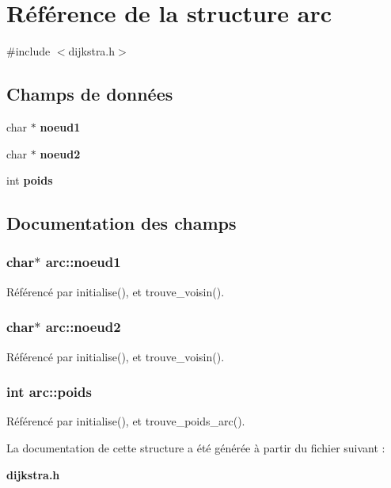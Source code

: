 \section{Référence de la structure arc}
\label{structarc}


{\ttfamily \#include $<$dijkstra.\+h$>$}

\subsection*{Champs de données}
\begin{DoxyCompactItemize}
\item 
char $\ast$ {\bf noeud1}
\item 
char $\ast$ {\bf noeud2}
\item 
int {\bf poids}
\end{DoxyCompactItemize}


\subsection{Documentation des champs}
\subsubsection[{noeud1}]{\setlength{\rightskip}{0pt plus 5cm}char$\ast$ arc\+::noeud1}\label{structarc_aa2263e0b245a2aa17c2bdcf0f98c6c05}


Référencé par initialise(), et trouve\+\_\+voisin().

\subsubsection[{noeud2}]{\setlength{\rightskip}{0pt plus 5cm}char$\ast$ arc\+::noeud2}\label{structarc_a5306f4a0edda9a31693f9a891ef4051b}


Référencé par initialise(), et trouve\+\_\+voisin().

\subsubsection[{poids}]{\setlength{\rightskip}{0pt plus 5cm}int arc\+::poids}\label{structarc_a3859eb36dff284afbc474e0eb89a2b7c}


Référencé par initialise(), et trouve\+\_\+poids\+\_\+arc().



La documentation de cette structure a été générée à partir du fichier suivant \+:\begin{DoxyCompactItemize}
\item 
{\bf dijkstra.\+h}\end{DoxyCompactItemize}

